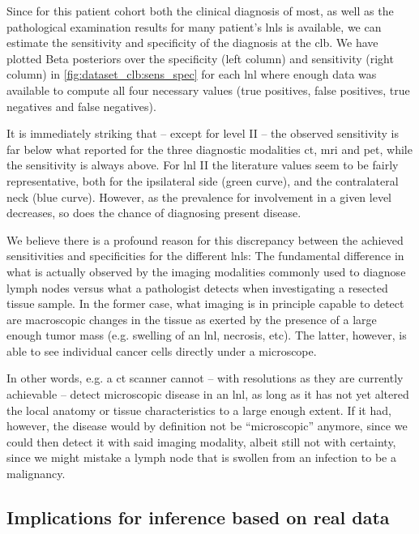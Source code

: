 \documentclass[\relativeRoot/main.tex]{subfiles}
\begin{document}
Since for this patient cohort both the clinical diagnosis of most, as well as the pathological examination results for many patient's \glspl{lnl} is available, we can estimate the sensitivity and specificity of the diagnosis at the \gls{clb}. We have plotted Beta posteriors over the specificity (left column) and sensitivity (right column) in \cref{fig:dataset_clb:sens_spec} for each \gls{lnl} where enough data was available to compute all four necessary values (true positives, false positives, true negatives and false negatives).

It is immediately striking that -- except for level II -- the observed sensitivity is far below what  reported for the three diagnostic modalities \gls{ct}, \gls{mri} and \gls{pet}, while the sensitivity is always above. For \gls{lnl} II the literature values seem to be fairly representative, both for the ipsilateral side (green curve), and the contralateral neck (blue curve). However, as the prevalence for involvement in a given level decreases, so does the chance of diagnosing present disease.

We believe there is a profound reason for this discrepancy between the achieved sensitivities and specificities for the different \glspl{lnl}: The fundamental difference in what is actually observed by the imaging modalities commonly used to diagnose lymph nodes versus what a pathologist detects when investigating a resected tissue sample. In the former case, what imaging is in principle capable to detect are macroscopic changes in the tissue as exerted by the presence of a large enough tumor mass (e.g. swelling of an \gls{lnl}, necrosis, etc). The latter, however, is able to see individual cancer cells directly under a microscope.

In other words, e.g. a \gls{ct} scanner cannot -- with resolutions as they are currently achievable -- detect microscopic disease in an \gls{lnl}, as long as it has not yet altered the local anatomy or tissue characteristics to a large enough extent. If it had, however, the disease would by definition not be ``microscopic'' anymore, since we could then detect it with said imaging modality, albeit still not with certainty, since we might mistake a lymph node that is swollen from an infection to be a malignancy.

\subsection{Implications for inference based on real data}
\label{subsec:dataset_clb:analysis:implications}
\end{document}
